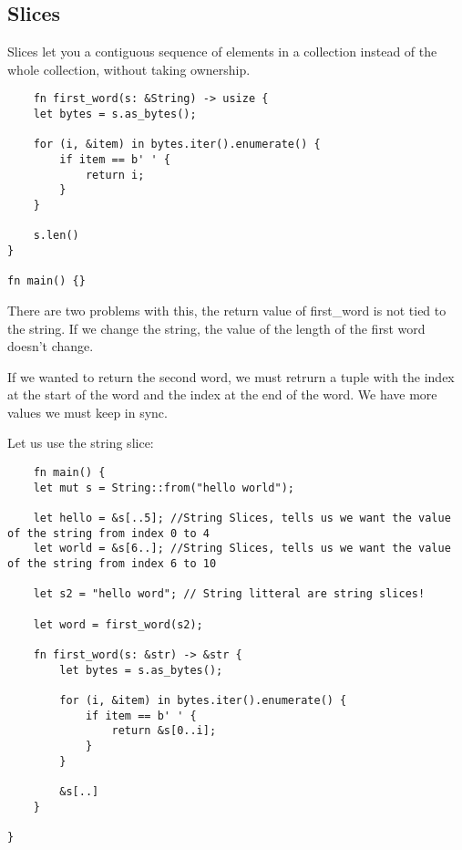 \subsection{Slices}

\begin{definition}
    Slices let you a contiguous sequence of elements in a collection instead of the whole collection, without taking ownership.
\end{definition}

\begin{lstlisting}
    fn first_word(s: &String) -> usize {
    let bytes = s.as_bytes();

    for (i, &item) in bytes.iter().enumerate() {
        if item == b' ' {
            return i;
        }
    }

    s.len()
}

fn main() {}
\end{lstlisting}

There are two problems with this, the return value of first\_word is not tied to the string.
If we change the string, the value of the length of the first word doesn't change.

If we wanted to return the second word, we must retrurn a tuple with the index at the start of the word and the index at the end of the word.
We have more values we must keep in sync.

Let us use the string slice:

\begin{lstlisting}
    fn main() {
    let mut s = String::from("hello world");

    let hello = &s[..5]; //String Slices, tells us we want the value of the string from index 0 to 4
    let world = &s[6..]; //String Slices, tells us we want the value of the string from index 6 to 10
    
    let s2 = "hello word"; // String litteral are string slices!

    let word = first_word(s2);

    fn first_word(s: &str) -> &str {
        let bytes = s.as_bytes();
    
        for (i, &item) in bytes.iter().enumerate() {
            if item == b' ' {
                return &s[0..i];
            }
        }
    
        &s[..]
    }
    
}

\end{lstlisting}

